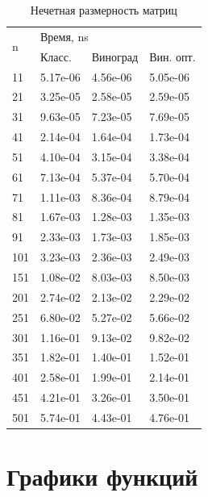\begin{table}[ht!]
\begin{subtable}[ht!]{0.45\textwidth}
		\label{tab:odd}
	\end{subtable}
	\hfill
	\begin{subtable}[ht!]{0.45\textwidth}
		\centering
		\caption{Нечетная размерность матриц}
		\begin{tabular}{||l|l|l|l||}
			\hline
			\multirow{2}{*}{n} & \multicolumn{3}{l|}{Время, ns} \\ \cline{2-4} 
			&  Класс. & Виноград & Вин. опт. \\ \hline\hline
			11 & 5.17e-06 & 4.56e-06 & 5.05e-06 \\ \hline 
			21 & 3.25e-05 & 2.58e-05 & 2.59e-05 \\ \hline 
			31 & 9.63e-05 & 7.23e-05 & 7.69e-05 \\ \hline 
			41 & 2.14e-04 & 1.64e-04 & 1.73e-04 \\ \hline 
			51 & 4.10e-04 & 3.15e-04 & 3.38e-04 \\ \hline 
			61 & 7.13e-04 & 5.37e-04 & 5.70e-04 \\ \hline 
			71 & 1.11e-03 & 8.36e-04 & 8.79e-04 \\ \hline 
			81 & 1.67e-03 & 1.28e-03 & 1.35e-03 \\ \hline 
			91 & 2.33e-03 & 1.73e-03 & 1.85e-03 \\ \hline 
			101 & 3.23e-03 & 2.36e-03 & 2.49e-03 \\ \hline 
			151 & 1.08e-02 & 8.03e-03 & 8.50e-03 \\ \hline 
			201 & 2.74e-02 & 2.13e-02 & 2.29e-02 \\ \hline 
			251 & 6.80e-02 & 5.27e-02 & 5.66e-02 \\ \hline 
			301 & 1.16e-01 & 9.13e-02 & 9.82e-02 \\ \hline 
			351 & 1.82e-01 & 1.40e-01 & 1.52e-01 \\ \hline 
			401 & 2.58e-01 & 1.99e-01 & 2.14e-01 \\ \hline 
			451 & 4.21e-01 & 3.26e-01 & 3.50e-01 \\ \hline 
			501 & 5.74e-01 & 4.43e-01 & 4.76e-01 \\ \hline 
		\end{tabular}
		\label{tab:even}
	\end{subtable}
	\label{tab:time}
\end{table} 

\newpage

\section{Графики функций}


